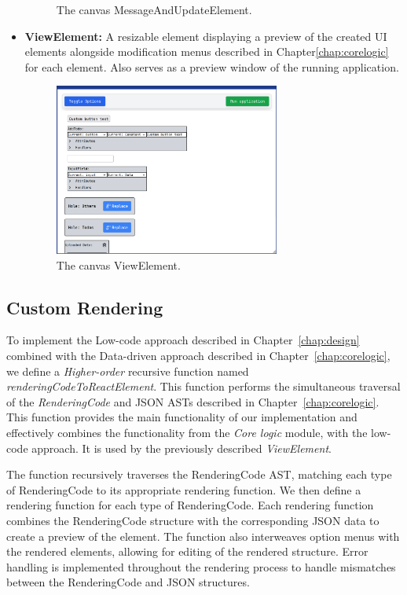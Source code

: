 \begin{itemize}
\begin{figure}[htbp]
\begin{center}
		      \end{center}
		      \caption{The canvas MessageAndUpdateElement.}\label{fig:message-menu}
	      \end{figure}
	\item \textbf{ViewElement:} A resizable element displaying a preview of the created UI elements alongside modification menus described in Chapter\ref{chap:corelogic} for each element. Also serves as a preview window of the running application.
	      \begin{figure}[htbp]
		      \begin{center}
			      \includegraphics[width=0.7\textwidth]{img/view-menu.pdf}
		      \end{center}
		      \caption{The canvas ViewElement.}\label{fig:view-menu}
	      \end{figure}
\end{itemize}


\medskip
\subsection{Custom Rendering}

To implement the Low-code approach described in Chapter~\ref{chap:design} combined with the Data-driven approach described in Chapter~\ref{chap:corelogic},
we define a \emph{Higher-order} recursive function named \emph{renderingCodeToReactElement}.
This function performs the simultaneous traversal of the \emph{RenderingCode} and JSON ASTs described in Chapter~\ref{chap:corelogic}.
This function provides the main functionality of our implementation and effectively combines the functionality from the \emph{Core logic} module,
with the low-code approach.
It is used by the previously described \emph{ViewElement}.

The function recursively traverses the RenderingCode AST, matching each type of RenderingCode to its appropriate rendering function.
We then define a rendering function for each type of RenderingCode.
Each rendering function combines the RenderingCode structure with the corresponding JSON data to create a preview of the element.
The function also interweaves option menus with the rendered elements, allowing for editing of the rendered structure.
Error handling is implemented throughout the rendering process to handle mismatches between the RenderingCode and JSON structures.

